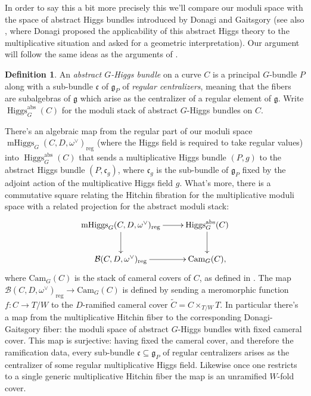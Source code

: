 \documentclass[11pt, oneside, reqno]{amsart}
\theoremstyle{definition} \newtheorem{definition}{Definition}[section]
\theoremstyle{definition} \newtheorem{remark}[definition]{Remark}
\theoremstyle{definition} \newtheorem{remarks}[definition]{Remarks}
\theoremstyle{definition} \newtheorem{question}[definition]{Question}
\theoremstyle{definition} \newtheorem*{note}{Note}
\theoremstyle{definition} \newtheorem{example}[definition]{Example}
\theoremstyle{definition} \newtheorem{examples}[definition]{Examples}
\renewcommand{\gg}{\mathfrak{g}}
\newcommand{\mr}[1]{\mathrm{#1}}
\newcommand{\mc}[1]{\mathcal{#1}}
\newcommand{\mf}[1]{\mathfrak{#1}}
\newcommand{\wt}[1]{\widetilde{#1}}
\newcommand{\sub}{\subseteq}
\DeclareMathOperator{\higgs}{Higgs}
\DeclareMathOperator{\mhiggs}{mHiggs}
\begin{document}
In order to say this a bit more precisely this we'll compare our moduli space with the space of abstract Higgs bundles introduced by Donagi and Gaitsgory \cite{DonagiGaitsgory} (see also \cite{DonagiLectures}, where Donagi proposed the applicability of this abstract Higgs theory to the multiplicative situation and asked for a geometric interpretation).  Our argument will follow the same ideas as the arguments of \cite[Section 6]{HurtubiseMarkman}.

\begin{definition}
An \emph{abstract $G$-Higgs bundle} on a curve $C$ is a principal $G$-bundle $P$ along with a sub-bundle $\mf c$ of $\gg_P$ of \emph{regular centralizers}, meaning that the fibers are subalgebras of $\gg$ which arise as the centralizer of a regular element of $\gg$.  Write $\higgs_G^{\mr{abs}}(C)$ for the moduli stack of abstract $G$-Higgs bundles on $C$.
\end{definition}

There's an algebraic map from the regular part of our moduli space $\mhiggs_G(C,D,\omega^\vee)_{\mr{reg}}$ (where the Higgs field is required to take regular values) into $\higgs_G^{\mr{abs}}(C)$ that sends a multiplicative Higgs bundle $(P,g)$ to the abstract Higgs bundle $(P, \mf c_g)$, where $\mf c_g$ is the sub-bundle of $\gg_P$ fixed by the adjoint action of the multiplicative Higgs field $g$.  What's more, there is a commutative square relating the Hitchin fibration for the multiplicative moduli space with a related projection for the abstract moduli stack:
\[\xymatrix{
\mhiggs_G(C,D,\omega^\vee)_{\mr{reg}} \ar[r] \ar[d] &\higgs_G^{\mr{abs}}(C) \ar[d] \\
\mc B(C,D,\omega^\vee)_{\mr{reg}} \ar[r] &\mr{Cam}_G(C),
}\]
where $\mr{Cam}_G(C)$ is the stack of cameral covers of $C$, as defined in \cite[Section 2.8]{DonagiGaitsgory}.  The map $\mc B(C,D,\omega^\vee)_{\mr{reg}} \to \mr{Cam}_G(C)$ is defined by sending a meromorphic function $f \colon C \to T/W$ to the $D$-ramified cameral cover $\wt C = C \times_{T/W} T$.  In particular there's a map from the multiplicative Hitchin fiber to the corresponding Donagi-Gaitsgory fiber: the moduli space of abstract $G$-Higgs bundles with fixed cameral cover.  This map is surjective: having fixed the cameral cover, and therefore the ramification data, every sub-bundle $\mf c \sub \gg_P$ of regular centralizers arises as the centralizer of some regular multiplicative Higgs field.  Likewise once one restricts to a single generic multiplicative Hitchin fiber the map is an unramified $W$-fold cover.
\end{document}
